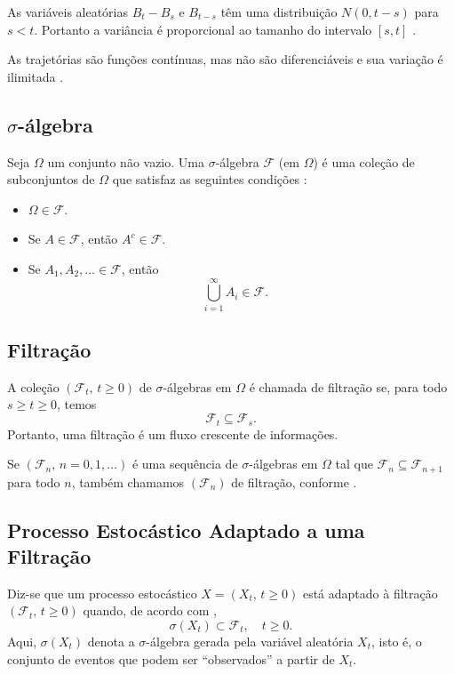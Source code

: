 \documentclass[12pt,openright,oneside,a4paper]{abntex2}
\numberwithin{equation}{section}
\begin{document}
As variáveis aleatórias $B_t - B_s$ e $B_{t-s}$ têm uma distribuição $N(0, t - s)$ para $s < t$.  
Portanto a variância é proporcional ao tamanho do intervalo $[s,t]$ \parencite [p. ~35] {Mikosh}. 

As trajetórias são funções contínuas, mas não são diferenciáveis e sua variação é ilimitada \parencite [Apêndice A3, p. 188]{Mikosh}.

\subsection{$\sigma$-álgebra}

Seja $\Omega$ um conjunto não vazio. Uma $\sigma$-álgebra $\mathcal{F}$ (em $\Omega$) é uma coleção de subconjuntos de $\Omega$ que satisfaz as seguintes condições \parencite [p.~62] {Mikosh}:

\begin{itemize}
    \item $\Omega \in \mathcal{F}$.
    \item Se $A \in \mathcal{F}$, então $A^c \in \mathcal{F}$.
    \item Se $A_1, A_2, \dots \in \mathcal{F}$, então
    \[\bigcup_{i=1}^{\infty} A_i \in \mathcal{F}. \quad\]
\end{itemize}

\subsection{Filtração}

A coleção \(\left(\mathcal{F}_t,\, t \geq 0\right)\) de \(\sigma\)-álgebras em \(\Omega\) é chamada de filtração se, para todo \(s \geq t \geq 0\), temos
\[
\mathcal{F}_t \subseteq \mathcal{F}_s.
\]
Portanto, uma filtração é um fluxo crescente de informações.

Se \(\left(\mathcal{F}_n,\, n = 0, 1, \ldots \right)\) é uma sequência de \(\sigma\)-álgebras em \(\Omega\) tal que \(\mathcal{F}_n \subseteq \mathcal{F}_{n+1}\) para todo \(n\), também chamamos \(\left(\mathcal{F}_n\right)\) de filtração, conforme \textcite[p.~77]{Mikosh}.

\subsection{Processo Estocástico Adaptado a uma Filtração}

Diz-se que um processo estocástico \(X = (X_t,\, t \geq 0)\) está adaptado à filtração \((\mathcal{F}_t,\, t \geq 0)\) quando, de acordo com \textcite[p.~77]{Mikosh},
\[
\sigma(X_t) \subset \mathcal{F}_t, \quad t \geq 0.
\]
Aqui, \(\sigma(X_t)\) denota a \(\sigma\)-álgebra gerada pela variável aleatória \(X_t\), isto é, o conjunto de eventos que podem ser ``observados'' a partir de \(X_t\).
\end{document}
